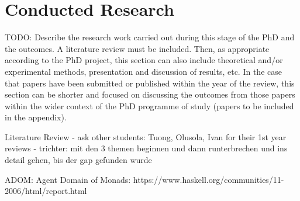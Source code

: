 \section{Conducted Research}
TODO: Describe the research work carried out during this stage of the PhD and the outcomes. A literature review must be included. Then, as appropriate according to the PhD project, this section can also include theoretical and/or experimental methods, presentation and discussion of results, etc. In the case that papers have been submitted or published within the year of the review, this section can be shorter and focused on discussing the outcomes from those papers within the wider context of the PhD programme of study (papers to be included in the appendix).

Literature Review
- ask other students: Tuong, Olusola, Ivan for their 1st year reviews
- trichter: mit den 3 themen beginnen und dann runterbrechen und ins detail gehen, bis der gap gefunden wurde

ADOM: Agent Domain of Monads: https://www.haskell.org/communities/11-2006/html/report.html